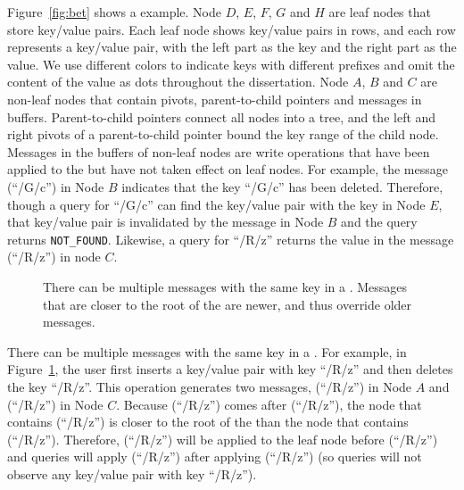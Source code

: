 Figure~\ref{fig:bet} shows a \bet example.
Node $D$, $E$, $F$, $G$ and $H$ are leaf nodes that store key/value pairs.
Each leaf node shows key/value pairs in rows,
and each row represents a key/value pair, with the left part as the key and
the right part as the value.
We use different colors to indicate keys with different prefixes and omit the
content of the value as dots throughout the dissertation.
Node $A$, $B$ and $C$ are non-leaf nodes that contain pivots, parent-to-child
pointers and messages in buffers.
Parent-to-child pointers connect all nodes into a tree, and the left and right
pivots of a parent-to-child pointer bound the key range of the child node.
Messages in the buffers of non-leaf nodes are write operations that have been
applied to the \bet but have not taken effect on leaf nodes.
For example, the message \delm(``/G/c'') in Node $B$ indicates that the key
``/G/c'' has been deleted.
Therefore, though a query for ``/G/c'' can find the key/value pair with the
key in Node $E$,
that key/value pair is invalidated by the message in Node $B$ and the
query returns \texttt{NOT\_FOUND}.
Likewise, a query for ``/R/z'' returns the value in the message
\putm(``/R/z'') in node $C$.

\begin{figure}[t]
    \centering
    
    \caption[A \bet example in which two messages have the same key]{\label{fig:bet-multi}
        There can be multiple messages with the same key in a \bet.
        Messages that are closer to the root of the \bet are newer, and thus
        override older messages.}
\end{figure}

There can be multiple messages with the same key in a \bet.
For example, in Figure~\ref{fig:bet-multi}, the user first inserts a key/value
pair with key ``/R/z'' and then deletes the key ``/R/z''.
This operation generates two messages,
\delm(``/R/z'') in Node $A$ and \putm(``/R/z'') in Node $C$.
Because \delm(``/R/z'') comes after \putm(``/R/z''),
the node that contains \delm(``/R/z'') is closer to the root of the \bet than
the node that contains \putm(``/R/z'').
Therefore, \putm(``/R/z'') will be applied to the leaf node before
\delm(``/R/z'') and queries will apply \delm(``/R/z'') after applying
\putm(``/R/z'') (so queries will not observe any key/value pair with key ``/R/z'').

